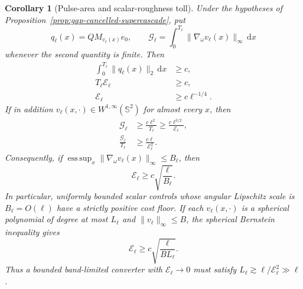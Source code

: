\documentclass[11pt]{article}
\newcommand{\dd}{\,\mathrm d}
\newtheorem{corollary}[theorem]{Corollary}
\theoremstyle{definition}
\theoremstyle{remark}
\begin{document}
\begin{corollary}[Pulse-area and scalar-roughness toll]
\label{cor:scalar-pulse-area-roughness}
Under the hypotheses of Proposition~\ref{prop:gap-cancelled-supercascade}, put
\begin{equation}
 q_\ell(x)=QM_{v_\ell(x)}e_0,
 \qquad
 \mathcal G_\ell=
 \int_0^{T_\ell}\|\nabla_\omega v_\ell(x)\|_\infty\dd x
 \label{eq:scalar-gradient-action}
\end{equation}
whenever the second quantity is finite.  Then
\begin{align}
 \int_0^{T_\ell}\|q_\ell(x)\|_2\dd x&\geq c,
 \label{eq:charged-pulse-area}\\
 T_\ell\mathcal E_\ell&\geq c,
 \label{eq:time-cost-uncertainty}\\
 \mathcal E_\ell&\geq c\ell^{-1/4}.
 \label{eq:gap-cancelled-quarter-cost}
\end{align}
If in addition $v_\ell(x,\cdot)\in W^{1,\infty}(\mathbb S^2)$ for almost
every $x$, then
\begin{align}
 \mathcal G_\ell
 &\geq \frac{c\ell^2}{T_\ell}
 \geq \frac{c\ell^{3/2}}{\mathcal E_\ell},
 \label{eq:gradient-action-toll}\\
 \frac{\mathcal G_\ell}{T_\ell}
 &\geq \frac{c\ell}{\mathcal E_\ell^2}.
 \label{eq:average-gradient-toll}
\end{align}
Consequently, if
$\operatorname*{ess\,sup}_x\|\nabla_\omega v_\ell(x)\|_\infty\leq B_\ell$,
then
\begin{equation}
 \mathcal E_\ell\geq c\sqrt{\frac{\ell}{B_\ell}}.
 \label{eq:Lipschitz-cost-floor}
\end{equation}
In particular, uniformly bounded scalar controls whose angular Lipschitz scale
is $B_\ell=O(\ell)$ have a strictly positive cost floor.  If each
$v_\ell(x,\cdot)$ is a spherical polynomial of degree at most $L_\ell$ and
$\|v_\ell\|_\infty\leq B$, the spherical Bernstein inequality gives
\begin{equation}
 \mathcal E_\ell\geq
 c\sqrt{\frac{\ell}{B L_\ell}}.
 \label{eq:bandwidth-cost-floor}
\end{equation}
Thus a bounded band-limited converter with $\mathcal E_\ell\to0$ must satisfy
$L_\ell\gtrsim \ell/\mathcal E_\ell^2\gg\ell$.
\end{corollary}
\end{document}
